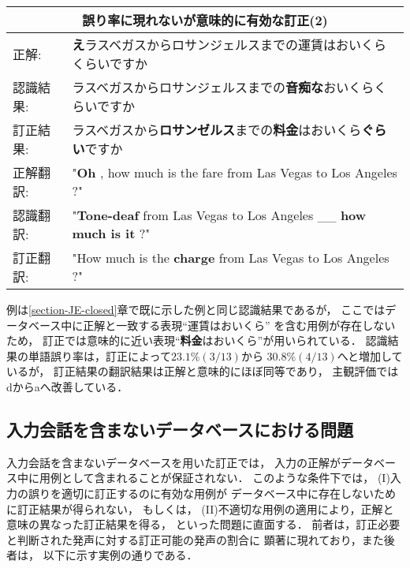 \begin{center}
\begin{tabular}{|ll|}
\multicolumn{2}{c}{誤り率に現れないが意味的に有効な訂正(2)}\\
\hline
正解: & {\bf え}ラスベガスからロサンジェルスまでの運賃はおいくらくらいですか \\
認識結果: & ラスベガスからロサンジェルスまでの{\bf 音痴な}おいくらくらいですか \\
訂正結果: & ラスベガスから{\bf ロサンゼルス}までの{\bf 料金}はおいくら{\bf ぐらい}ですか \\
\hline
正解翻訳: & "{\bf Oh} , how much is the fare from Las Vegas to Los Angeles ?" \\
認識翻訳: & "{\bf Tone-deaf} from Las Vegas to Los Angeles \_\_ {\bf how much is it} ?" \\
訂正翻訳: & "How much is the {\bf charge} from Las Vegas to Los Angeles ?" \\
\hline
\end{tabular}
\end{center}

例は\ref{section-JE-closed}章で既に示した例と同じ認識結果であるが，
ここではデータベース中に正解と一致する表現``運賃はおいくら''
を含む用例が存在しないため，
訂正では意味的に近い表現``{\bf 料金}はおいくら''が用いられている．
認識結果の単語誤り率は，訂正によって$23.1\%(3/13)$から
$30.8\%(4/13)$へと増加しているが，
訂正結果の翻訳結果は正解と意味的にほぼ同等であり，
主観評価ではdからaへ改善している．

\subsection{入力会話を含まないデータベースにおける問題}

入力会話を含まないデータベースを用いた訂正では，
入力の正解がデータベース中に用例として含まれることが保証されない．
このような条件下では，
(I)入力の誤りを適切に訂正するのに有効な用例が
データベース中に存在しないために訂正結果が得られない，
もしくは，
(II)不適切な用例の適用により，正解と意味の異なった訂正結果を得る，
といった問題に直面する．
前者は，訂正必要と判断された発声に対する訂正可能の発声の割合に
顕著に現れており，また後者は，
以下に示す実例の通りである．

